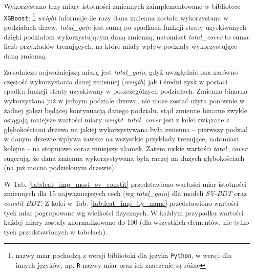 Wykorzystano trzy miary istotności zmiennych zaimplementowane w bibliotece \texttt{XGBoost}: 
\footnote{nazwy miar pochodzą z wersji biblioteki dla języka \texttt{Python}, w wersji dla innych języków, np. \texttt{R} nazwy miar oraz ich znaczenie są różne} 
\textit{weight} informuje ile razy dana zmienna została wykorzystana w podziałach drzew.  
\textit{total\_gain} jest sumą po spadkach funkcji straty uzyskiwanych dzięki podziałom wykorzystującym daną zmienną, natomiast
\textit{total\_cover} to suma liczb przykładów trenujących, na które miały wpływ podziały wykorzystujące daną zmienną.

Zasadniczo najważniejszą miarą jest \textit{total\_gain}, gdyż uwzględnia ona zarówno częstość wykorzystania danej zmiennej (\textit{weigth}) jak i średni zysk w postaci spadku funkcji straty uzyskiwany w poszczególnych podziałach. 
Zmienna binarna wykorzystana już w jednym podziale drzewa, nie może zostać użyta ponownie w żadnej gałęzi będącej kontynuacją danego podziału, stąd zmienne binarne zwykle osiągają mniejsze wartości miary \textit{weight}.
\textit{total\_cover} jest z kolei związane z głębokościami drzewa na jakiej wykorzystywana była zmienna -- pierwszy podział w danym drzewie wpływa zawsze na wszystkie przykłady trenujące, natomiast kolejne -- na stopniowo coraz mniejszy ułamek. Zatem niskie wartości \textit{total\_cover} sugerują, że dana zmienna wykorzystywana była raczej na dużych głębokościach (na już mocno podzielonym drzewie).

W Tab. \ref{tab:feat_imp_most_sv_constit} przedstawiono wartości miar istotności zmiennych dla 15 najważniejszych cech (wg \textit{total\_gain}) dla modeli \textit{SV-BDT} oraz \textit{constit-BDT}. 
Z kolei w Tab. \ref{tab:feat_imp_by_name} przedstawiono wartości tych miar pogrupowane wg wielkości fizycznych.
W każdym przypadku wartości każdej miary zostały znormalizowane do 100 (dla wszystkich elementów, nie tylko tych przedstawionych w tabelach).

\newlength{\everyNthRowSpace}
\setlength{\everyNthRowSpace}{8pt}

